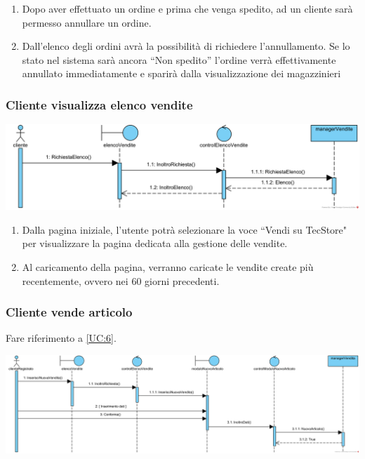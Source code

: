 \documentclass[12pt,a4paper]{article}
\begin{document}
\begin{enumerate}
\item Dopo aver effettuato un ordine e prima che venga spedito, ad un cliente sarà permesso annullare un ordine.
\item Dall'elenco degli ordini avrà la possibilità di richiedere l'annullamento. Se lo stato nel sistema sarà ancora ``Non spedito'' l'ordine verrà effettivamente annullato immediatamente e sparirà dalla visualizzazione dei magazzinieri %
\end{enumerate}


\subsubsection{Cliente visualizza elenco vendite}
\label{SD:elencovendite}

\begin{center}
\includegraphics[width=\textwidth]{SequenceDiagram/ClienteElencoVendite}
\end{center}

\begin{enumerate}
\item Dalla pagina iniziale, l'utente potrà selezionare la voce ``Vendi su TecStore" per visualizzare la pagina dedicata alla gestione delle vendite.
\item Al caricamento della pagina, verranno caricate le vendite create più recentemente, ovvero nei 60 giorni precedenti.
\end{enumerate}

\subsubsection{Cliente vende articolo}
\label{SD:creazionevendita}

Fare riferimento a \ref{UC:6}. \\

\begin{center}
\includegraphics[width=\textwidth]{SequenceDiagram/ClienteVendeNuovoArticolo}
\end{center}
\end{document}
